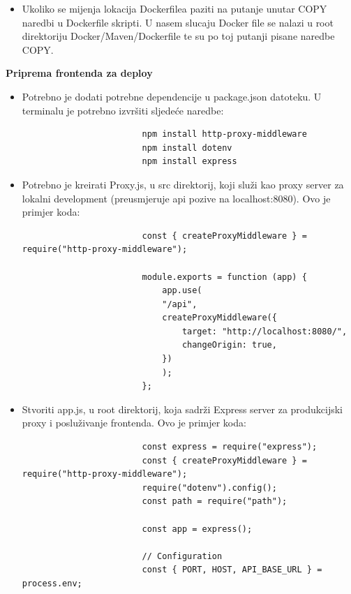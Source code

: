 \begin{packed_enum}
\begin{itemize}
\begin{lstlisting}
					
						FROM openjdk:17-alpine
						
						COPY --from=builder target/*.jar /app.jar
						
						EXPOSE 8080
						
						ENTRYPOINT ["java","-jar","/app.jar"]
						
					\end{lstlisting}
					\item Ukoliko se mijenja lokacija Dockerfilea paziti na putanje unutar COPY naredbi u Dockerfile skripti. U nasem slucaju Docker file se nalazi u root direktoriju Docker/Maven/Dockerfile te su po toj putanji pisane naredbe COPY.
				\end{itemize}
				
				\item \textbf{Priprema frontenda za deploy}
				\begin{itemize}
					\item Potrebno je dodati potrebne dependencije u package.json datoteku. U terminalu je potrebno izvršiti sljedeće naredbe:
					\begin{lstlisting}
						npm install http-proxy-middleware
						npm install dotenv
						npm install express
					\end{lstlisting}
					\item Potrebno je kreirati Proxy.js, u src direktorij, koji služi kao proxy server za lokalni development (preusmjeruje api pozive na localhost:8080). Ovo je primjer koda:
					\begin{lstlisting}
						const { createProxyMiddleware } = require("http-proxy-middleware");
						
						module.exports = function (app) {
							app.use(
							"/api",
							createProxyMiddleware({
								target: "http://localhost:8080/",
								changeOrigin: true,
							})
							);
						};
					\end{lstlisting}
					\item Stvoriti app.js, u root direktorij, koja sadrži Express server za produkcijski proxy i posluživanje frontenda. Ovo je primjer koda:
					\begin{lstlisting}
						const express = require("express");
						const { createProxyMiddleware } = require("http-proxy-middleware");
						require("dotenv").config();
						const path = require("path");
						
						const app = express();
						
						// Configuration
						const { PORT, HOST, API_BASE_URL } = process.env;
						

\end{lstlisting}
\end{itemize}
\end{packed_enum}
